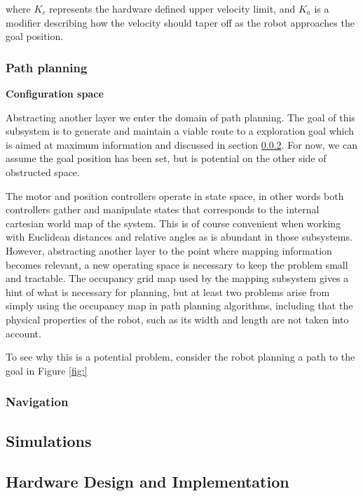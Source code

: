 where $K_c$ represents the hardware defined upper velocity limit, and $K_a$ is a modifier describing how the velocity should taper off as the robot approaches the goal position.

\subsubsection{Path planning}
\label{sec:path-plan}

\textbf{Configuration space}

Abstracting another layer we enter the domain of path planning. The goal of this subsystem is to generate and maintain a viable route to a exploration goal which is aimed at maximum information and discussed in section \ref{sec:navigation}. For now, we can assume the goal position has been set, but is potential on the other side of obstructed space. 

The motor and position controllers operate in state space, in other words both controllers gather and manipulate states that corresponds to the internal cartesian world map of the system. This is of course convenient when working with Euclidean distances and relative angles as is abundant in those subsystems. However, abstracting another layer to the point where mapping information becomes relevant, a new operating space is necessary to keep the problem small and tractable. The occupancy grid map used by the mapping subsystem gives a hint of what is necessary for planning, but at least two problems arise from simply using the occupancy map in path planning algorithms, including that the physical properties of the robot, such as its width and length are not taken into account.

To see why this is a potential problem, consider the robot planning a path to the goal in Figure \ref{fig:}

\subsubsection{Navigation}
\label{sec:navigation}

\subsection{Simulations}
\label{sec:sim}

\subsection{Hardware Design and Implementation}

